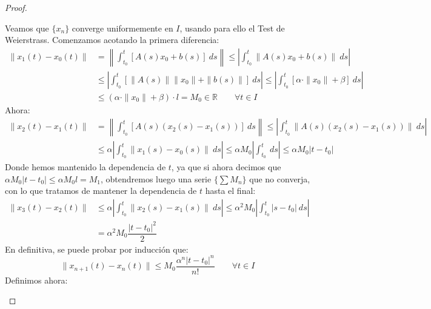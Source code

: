 \begin{teo}
\begin{proof}
\begin{itemize}
\begin{description}
                        Veamos que $\{x_n\}$ converge uniformemente en $I$, usando para ello el Test de Weierstrass. Comenzamos acotando la primera diferencia:
                        \begin{align*}
                            \|x_1(t) - x_0(t)\| &= \left\|\int_{t_0}^{t} [A(s)x_0+b(s)]~ds \right\| \leq \left|\int_{t_0}^{t}\| A(s)x_0 + b(s)\|~ds \right| \\
                                                &\leq \left|\int_{t_0}^{t}\left[ \|A(s)\|\|x_0\| + \|b(s)\|\right]~ds \right| \leq \left|\int_{t_0}^{t} [\alpha\cdot  \|x_0\| + \beta]~ds \right| \\
                                                &\leq (\alpha\cdot \|x_0\|+\beta)\cdot l = M_0 \in \mathbb{R} \qquad \forall t\in I
                        \end{align*}
                        Ahora:
                        \begin{align*}
                            \|x_2(t) - x_1(t)\| &= \left\|\int_{t_0}^{t} [A(s)(x_2(s)-x_1(s))]~ds \right\| \leq  \left|\int_{t_0}^{t} \|A(s)(x_2(s)-x_1(s))\|~ds \right| \\
                                                &\leq \alpha\left|\int_{t_0}^{t} \|x_1(s)-x_0(s)\|~ds \right| \leq \alpha M_0 \left|\int_{t_0}^{t}~ds \right| \leq \alpha M_0 |t-t_0|
                        \end{align*}
                        Donde hemos mantenido la dependencia de $t$, ya que si ahora decimos que $\alpha M_0 |t-t_0|\leq \alpha M_0 l = M_1$, obtendremos luego una serie $\{\sum M_n\}$ que no converja, con lo que tratamos de mantener la dependencia de $t$ hasta el final:
                        \begin{align*}
                            \|x_3(t)-x_2(t)\| &\leq \alpha \left|\int_{t_0}^{t} \|x_2(s)-x_1(s)\|~ds \right| \leq \alpha^2 M_0 \left|\int_{t_0}^{t} |s-t_0|~ds \right| \\
                                              &= \alpha^2 M_0 \dfrac{{|t-t_0|}^{2}}{2}
                        \end{align*}
                        En definitiva, se puede probar por inducción que:
                        \begin{equation*}
                            \|x_{n+1}(t) - x_n(t)\| \leq M_0 \dfrac{\alpha^n{|t-t_0|}^{n}}{n!} \qquad \forall t\in I
                        \end{equation*}
                        Definimos ahora:
                        \begin{equation*}

\end{equation*}
\end{description}
\end{itemize}
\end{proof}
\end{teo}
